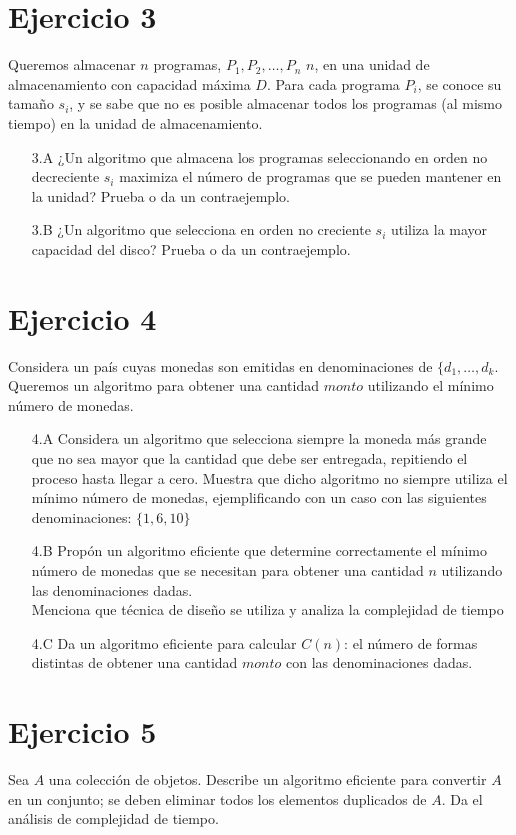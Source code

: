 \documentclass[12pt]{article}
\begin{document}
\section*{Ejercicio 3}
\noindent Queremos almacenar $n$ programas, $P_1, P_2, \ldots, P_n$ $n$, en una unidad de almacenamiento con capacidad máxima $D$. Para cada programa $P_i$, se conoce su tamaño $s_i$, y se sabe que no es posible almacenar todos los programas (al mismo tiempo) en la unidad de almacenamiento.
\begin{enumerate}
    \item[3.A] ¿Un algoritmo que almacena los programas seleccionando en orden no decreciente $s_i$ maximiza el número de programas que se pueden mantener en la unidad? Prueba o da un contraejemplo.
    \item[3.B] ¿Un algoritmo que selecciona en orden no creciente $s_i$ utiliza la mayor capacidad del disco? Prueba o da un contraejemplo.
\end{enumerate}

\section*{Ejercicio 4}
\noindent Considera un país cuyas monedas son emitidas en denominaciones de $\{ d_1, \ldots, d_k $. Queremos un algoritmo para obtener una cantidad $monto$ utilizando el mínimo número de monedas.
\begin{enumerate}
    \item[4.A] Considera un algoritmo que selecciona siempre la moneda más grande que no sea mayor que la cantidad que debe ser entregada, repitiendo el proceso hasta llegar a cero. Muestra que dicho algoritmo no siempre utiliza el mínimo número de monedas, ejemplificando con un caso con las siguientes denominaciones: $ \{ 1, 6, 10 \}$
    \item[4.B] Propón un algoritmo eficiente que determine correctamente el mínimo número de monedas que se necesitan para obtener una cantidad $n$ utilizando las denominaciones dadas.\\
    Menciona que técnica de diseño se utiliza y analiza la complejidad de tiempo
    \item[4.C] Da un algoritmo eficiente para calcular $C(n)$: el número de formas distintas de obtener una cantidad $monto$ con las denominaciones dadas.
\end{enumerate}

\section*{Ejercicio 5}
\noindent Sea $A$ una colección de objetos. Describe un algoritmo eficiente para convertir $A$ en un conjunto; se deben eliminar todos los elementos duplicados de $A$. Da el análisis de complejidad de tiempo.
\end{document}
